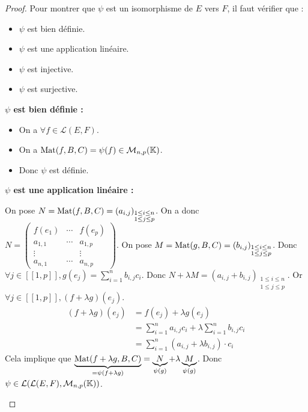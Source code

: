 \documentclass[12pt, a4paper]{report}
\begin{document}
\begin{proof}
    Pour montrer que $\psi$ est un isomorphisme de $E$ vers $F$, il faut vérifier que :
    \begin{itemize}
        \item $\psi$ est bien définie.
        \item $\psi$ est une application linéaire.
        \item $\psi$ est injective.
        \item $\psi$ est surjective.
    \end{itemize}

    \textbf{$\psi$ est bien définie :}

    \begin{itemize}
        \item On a $\forall f \in \mathcal L(E,F)$.
        \item On a $\mathrm{Mat}(f,B,C) = \psi(f) \in \mathcal M_{n,p}(\mathbb{K})$.
        \item Donc $\psi$ est définie.
    \end{itemize}

    \textbf{$\psi$ est une application linéaire :}

    \begin{outline}
    \1 On pose $N = \mathrm{Mat}(f,B,C) = (a_{i,j})_{\substack{1 \le i \le n\\ 1 \le j \le p}}$.
    \2 On a donc $N = \left(\begin{matrix} f(e_1) & \cdots & f(e_p)\\
    a_{1,1} & \cdots & a_{1,p} \\
    \vdots & & \vdots \\
    a_{n,1} & \cdots & a_{n,p}
    \end{matrix}\right)$.
    \1 On pose $M = \mathrm{Mat}(g,B,C) = (b_{i,j})_{\substack{1 \le i \le n\\ 1 \le j \le p}}$.
    \2 Donc $\forall j \in [\![1,p]\!], g(e_j) = \sum_{i=1}^{n}b_{i,j}c_i$.
    \1 Donc $N + \lambda M = (a_{i,j} + b_{i,j})_{\substack{1 \le i \le n\\ 1 \le j \le p}}$.
    \1 Or $\forall j \in [\![1,p]\!], (f+\lambda g)(e_j)$.
    \begin{align*}
        (f+ \lambda g)(e_j) &= f(e_j) + \lambda g(e_j)\\
        &= \sum_{i=1}^n a_{i,j} c_i + \lambda \sum_{i=1}^{n}b_{i,j}c_i\\
        &= \sum_{i=1}^{n}(a_{i,j}+\lambda b_{i,j})\cdot c_i
    \end{align*}
    \1 Cela implique que $\underbrace{\mathrm{Mat}(f+\lambda g,B,C)}_{=\psi(f+\lambda g)}= \underbrace{N}_{\psi(g)} + \lambda \underbrace{M}_{\psi(g)}$.
    \1 Donc $\psi \in \mathcal L(\mathcal L(E,F), \mathcal M_{n,p}(\mathbb{K}))$.
    \end{outline}


\end{proof}
\end{document}
